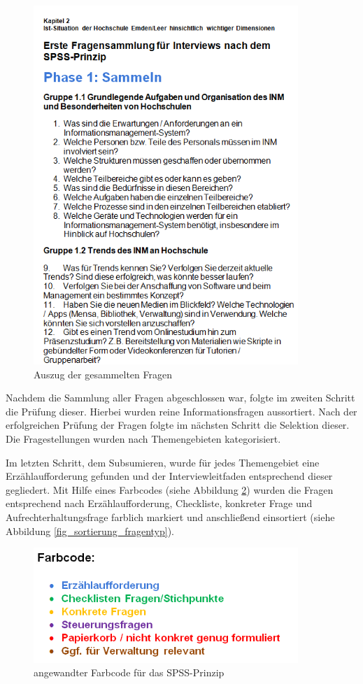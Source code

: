 \begin{figure}[h!]
	\centering
	\includegraphics[width=10cm]{kapitel/gruppe2/bilder/auszug_fragen}
	\caption{Auszug der gesammelten Fragen}
	\label{fig_auszug_fragen_sammeln}
\end{figure}

Nachdem die Sammlung aller Fragen abgeschlossen war, folgte im zweiten Schritt die Prüfung dieser. Hierbei wurden reine Informationsfragen aussortiert. Nach der erfolgreichen Prüfung der Fragen folgte im nächsten Schritt die Selektion dieser. Die Fragestellungen wurden nach Themengebieten kategorisiert. 

Im letzten Schritt, dem Subsumieren, wurde für jedes Themengebiet eine Erzählaufforderung gefunden und der Interviewleitfaden entsprechend dieser gegliedert. Mit Hilfe eines Farbcodes (siehe Abbildung \ref{fig_farbcode_SPSS}) wurden die Fragen entsprechend nach Erzählaufforderung, Checkliste, konkreter Frage und Aufrechterhaltungsfrage farblich markiert und anschließend einsortiert (siehe Abbildung \ref{fig_sortierung_fragentyp}).

\begin{figure}[h!]
	\centering
	\includegraphics[width=10cm]{kapitel/gruppe2/bilder/farbcode_spss}
	\caption{angewandter Farbcode für das SPSS-Prinzip}
	\label{fig_farbcode_SPSS}
\end{figure}

